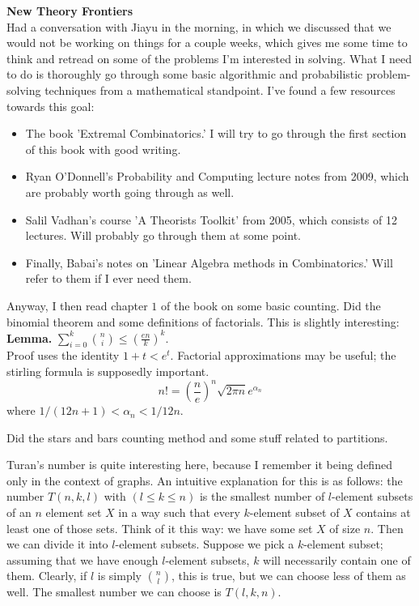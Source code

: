 \documentclass{tufte-book}
\newenvironment{loggentry}[2]%
{\noindent\textbf{#2}\marginnote{#1}\\}{\vspace{0.5cm}}
\begin{document}
	
	
	\begin{loggentry}{2024-Feb-14}{New Theory Frontiers}
		Had a conversation with Jiayu in the morning, in which we discussed that we would not be working on things for a couple weeks, which gives me some time to think and retread on some of the problems I'm interested in solving. What I need to do is thoroughly go through some basic algorithmic and probabilistic problem-solving techniques from a mathematical standpoint. I've found a few resources towards this goal:
		\begin{itemize}
			\item The book 'Extremal Combinatorics.' I will try to go through the first section of this book with good writing.
			\item Ryan O'Donnell's Probability and Computing lecture notes from 2009, which are probably worth going through as well.
			\item Salil Vadhan's course 'A Theorists Toolkit' from 2005, which consists of 12 lectures. Will probably go through them at some point.
			\item Finally, Babai's notes on 'Linear Algebra methods in Combinatorics.' Will refer to them if I ever need them.
		\end{itemize}
	
	Anyway, I then read chapter $1$ of the book on some basic counting. Did the binomial theorem and some definitions of factorials. This is slightly interesting:\\
	
	\textbf{Lemma.} $\sum_{i=0}^k\binom{n}{i}\leq\left(\frac{en}{k}\right)^k$.\\
	
	Proof uses the identity $1+t<e^t$. Factorial approximations may be useful; the stirling formula is supposedly important.
	$$n!=\left(\frac{n}{e}\right)^n\sqrt{2\pi n}e^{\alpha_n}$$
	where $1/(12n+1)<\alpha_n<1/12n$.
	
	Did the stars and bars counting method and some stuff related to partitions.
	
	Turan's number is quite interesting here, because I remember it being defined only in the context of graphs. An intuitive explanation for this is as follows: the number $T(n,k,l)$ with $(l\leq k\leq n)$ is the smallest number of $l$-element subsets of an $n$ element set $X$ in a way such that every $k$-element subset of $X$ contains at least one of those sets. Think of it this way: we have some set $X$ of size $n$. Then we can divide it into $l$-element subsets. Suppose we pick a $k$-element subset; assuming that we have enough $l$-element subsets, $k$ will necessarily contain one of them. Clearly, if $l$ is simply $\binom{n}{l}$, this is true, but we can choose less of them as well. The smallest number we can choose is $T(l,k,n)$.
	\end{loggentry}
\end{document}
